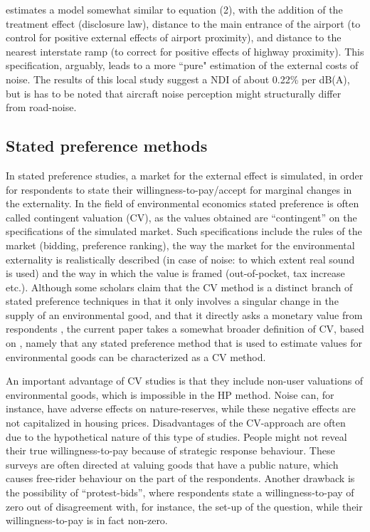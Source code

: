 \documentclass[a4paper]{scrartcl}
\begin{document}
\cite{Pope2008} estimates a model somewhat similar to equation (2), with the addition of the treatment effect (disclosure law), distance to the main entrance of the airport (to control for positive external effects of airport proximity), and distance to the nearest interstate ramp (to correct for positive effects of highway proximity). This specification, arguably, leads to a more ``pure" estimation of the external costs of noise. The results of this local study suggest a NDI of about 0.22\% per dB(A), but is has to be noted that aircraft noise perception might structurally differ from road-noise.

\subsection{Stated preference methods}

In stated preference studies, a market for the external effect is simulated, in order for respondents to state their willingness-to-pay/accept for marginal changes in the externality. In the field of environmental economics stated preference is often called contingent valuation (CV), as the values obtained are “contingent” on the specifications of the simulated market. Such specifications include the rules of the market (bidding, preference ranking), the way the market for the environmental externality is realistically described (in case of noise: to which extent real sound is used) and the way in which the value is framed (out-of-pocket, tax increase etc.)\citep{Carson2005}. Although some scholars claim that the CV method is a distinct branch of stated preference techniques in that it only involves a singular change in the supply of an environmental good, and that it directly asks a monetary value from respondents \citep{Wardman2004}, the current paper takes a somewhat broader definition of CV, based on \cite{Carson2005}, namely that any stated preference method that is used to estimate values for environmental goods can be characterized as a CV method.

An important advantage of CV studies is that they include non-user valuations of environmental goods, which is impossible in the HP method. Noise can, for instance, have adverse effects on nature-reserves, while these negative effects are not capitalized in housing prices. Disadvantages of the CV-approach are often due to the hypothetical nature of this type of studies. People might not reveal their true willingness-to-pay because of strategic response behaviour. These surveys are often directed at valuing goods that have a public nature, which causes free-rider behaviour on the part of the respondents. Another drawback is the possibility of “protest-bids”, where respondents state a willingness-to-pay of zero out of disagreement with, for instance, the set-up of the question, while their willingness-to-pay is in fact non-zero.
\end{document}
